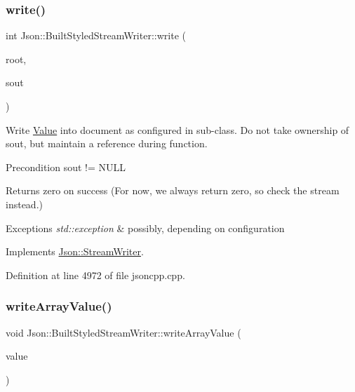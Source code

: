 \subsubsection{\texorpdfstring{write()}{write()}}
{\footnotesize\ttfamily int Json\+::\+Built\+Styled\+Stream\+Writer\+::write (\begin{DoxyParamCaption}\item[{\hyperlink{class_json_1_1_value}{Value} const \&}]{root,  }\item[{\hyperlink{config_8h_a37a25be5fca174927780caeb280094ce}{J\+S\+O\+N\+C\+P\+P\+\_\+\+O\+S\+T\+R\+E\+AM} $\ast$}]{sout }\end{DoxyParamCaption})\hspace{0.3cm}{\ttfamily [virtual]}}

Write \hyperlink{class_json_1_1_value}{Value} into document as configured in sub-\/class. Do not take ownership of sout, but maintain a reference during function. \begin{DoxyPrecond}{Precondition}
sout != N\+U\+LL 
\end{DoxyPrecond}
\begin{DoxyReturn}{Returns}
zero on success (For now, we always return zero, so check the stream instead.) 
\end{DoxyReturn}

\begin{DoxyExceptions}{Exceptions}
{\em std\+::exception} & possibly, depending on configuration \\
\hline
\end{DoxyExceptions}


Implements \hyperlink{class_json_1_1_stream_writer_a84278bad0c9a9fc587bc2a97c5bb5993}{Json\+::\+Stream\+Writer}.



Definition at line 4972 of file jsoncpp.\+cpp.

\hypertarget{struct_json_1_1_built_styled_stream_writer_acd20e9274bbcf7876ef3af2e7d23a31f}{}\label{struct_json_1_1_built_styled_stream_writer_acd20e9274bbcf7876ef3af2e7d23a31f} 
\subsubsection{\texorpdfstring{write\+Array\+Value()}{writeArrayValue()}}
{\footnotesize\ttfamily void Json\+::\+Built\+Styled\+Stream\+Writer\+::write\+Array\+Value (\begin{DoxyParamCaption}\item[{\hyperlink{class_json_1_1_value}{Value} const \&}]{value }\end{DoxyParamCaption})\hspace{0.3cm}{\ttfamily [private]}}



